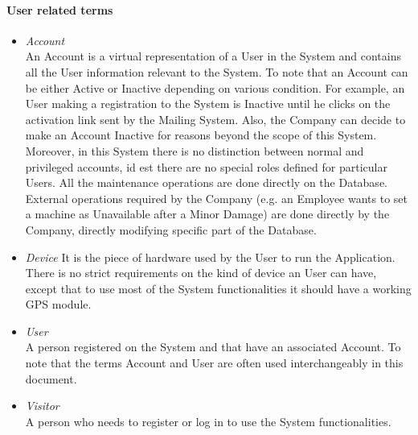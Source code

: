 \paragraph{User related terms}
\begin{itemize}
	\item \emph{Account} \\
	An Account is a virtual representation of a User in the System and contains all the User information relevant to the System. To note that an Account can be either Active or Inactive depending on various condition. For example, an User making a registration to the System is Inactive until he clicks on the activation link sent by the Mailing System. Also, the Company can decide to make an Account Inactive for reasons beyond the scope of this System.
	Moreover, in this System there is no distinction between normal and privileged accounts, id est there are no special roles defined for particular Users. All the maintenance operations are done directly on the Database.
	External operations required by the Company (e.g. an Employee wants to set a machine as Unavailable after a Minor Damage) are done directly by the Company, directly modifying specific part of the Database.
	
	\item \emph{Device}
	It is the piece of hardware used by the User to run the Application. There is no strict requirements on the kind of device an User can have, except that to use most of the System functionalities it should have a working GPS module.
			
	\item \emph{User}\\
	A person registered on the System and that have an associated Account. To note that the terms Account and User are often used interchangeably in this document.

	\item \emph{Visitor}\\
	A person who needs to register or log in to use the System functionalities.	
	\end{itemize}
	
